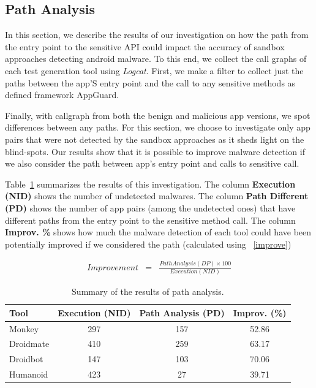 \subsection{Path Analysis}\label{sec:path}

In this section, we describe the results of our investigation on how the path from the entry point to the sensitive API could impact the accuracy of sandbox approaches detecting android malware. To this end, we collect the call graphs of each test generation tool using \emph{Logcat}. First, we make a filter to collect just the paths between the app'S entry point and the call to any sensitive methods as defined framework AppGuard.

Finally, with callgraph from both the benign and malicious app versions, we spot differences between any paths. For this section, we choose to investigate only app pairs that were not detected by the sandbox approaches as it sheds light on the blind-spots. Our results show that it is possible to improve malware detection if we also consider the path between app's entry point and calls to sensitive call.

Table~\ref{tab:pa} summarizes the results of this investigation. The column \textbf{Execution (NID)} shows the number of undetected malwares. The column  \textbf{Path Different (PD)} shows the number of app pairs (among the undetected ones) that have different paths from the entry point to the sensitive method call. The column \textbf{Improv. \%} shows how much the malware detection of each tool could have been potentially improved if we considered the path (calculated using ~\eqref{improve})


\begin{eqnarray}
Improvement & = & \frac{Path Analysis (DP) \times 100}{Execution (NID)} 
\label{improve}
\end{eqnarray}



\begin{table}[h]
  \caption{Summary of the results of path analysis. }
  \centering
  \begin{small}
 \begin{tabular}{lccc}
   \toprule
   Tool & Execution (NID) & Path Analysis (PD) & Improv. (\%) \\   \midrule
   Monkey &  297 & 157 & 52.86 \\ 
   Droidmate &  410 & 259 & 63.17 \\ 
   Droidbot &  147 & 103 & 70.06 \\ 
   Humanoid &  423 & 27 & 39.71 \\ 
 \bottomrule
 \end{tabular}
 \end{small}
 \label{tab:pa}
\end{table}



